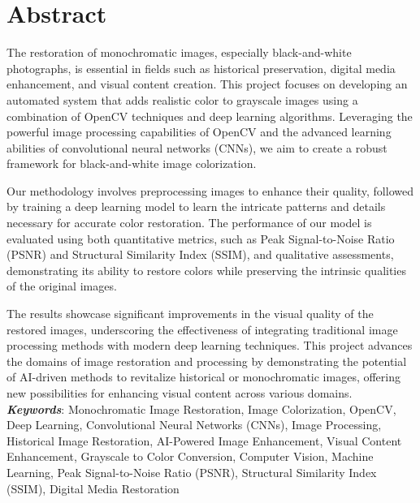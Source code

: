 \clearpage
{}
{}
\chapter*{Abstract}
The restoration of monochromatic images, especially black-and-white photographs, is essential in fields such as historical preservation, digital media enhancement, and visual content creation. This project focuses on developing an automated system that adds realistic color to grayscale images using a combination of OpenCV techniques and deep learning algorithms. Leveraging the powerful image processing capabilities of OpenCV and the advanced learning abilities of convolutional neural networks (CNNs), we aim to create a robust framework for black-and-white image colorization.

Our methodology involves preprocessing images to enhance their quality, followed by training a deep learning model to learn the intricate patterns and details necessary for accurate color restoration. The performance of our model is evaluated using both quantitative metrics, such as Peak Signal-to-Noise Ratio (PSNR) and Structural Similarity Index (SSIM), and qualitative assessments, demonstrating its ability to restore colors while preserving the intrinsic qualities of the original images.

The results showcase significant improvements in the visual quality of the restored images, underscoring the effectiveness of integrating traditional image processing methods with modern deep learning techniques. This project advances the domains of image restoration and processing by demonstrating the potential of AI-driven methods to revitalize historical or monochromatic images, offering new possibilities for enhancing visual content across various domains.
\\

\textbf{\textit{Keywords}}: Monochromatic Image Restoration, Image Colorization, OpenCV, Deep Learning, Convolutional Neural Networks (CNNs), Image Processing, Historical Image Restoration, AI-Powered Image Enhancement, Visual Content Enhancement, Grayscale to Color Conversion, Computer Vision, Machine Learning, Peak Signal-to-Noise Ratio (PSNR), Structural Similarity Index (SSIM), Digital Media Restoration